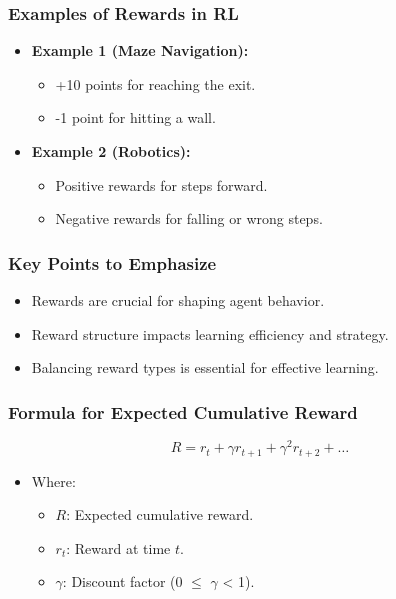 \documentclass{beamer}
\begin{document}
\begin{frame}[fragile]
    \frametitle{Examples of Rewards in RL}
    \begin{itemize}
        \item \textbf{Example 1 (Maze Navigation):}
        \begin{itemize}
            \item +10 points for reaching the exit.
            \item -1 point for hitting a wall.
        \end{itemize}
        \item \textbf{Example 2 (Robotics):}
        \begin{itemize}
            \item Positive rewards for steps forward.
            \item Negative rewards for falling or wrong steps.
        \end{itemize}
    \end{itemize}
\end{frame}

\begin{frame}[fragile]
    \frametitle{Key Points to Emphasize}
    \begin{itemize}
        \item Rewards are crucial for shaping agent behavior.
        \item Reward structure impacts learning efficiency and strategy.
        \item Balancing reward types is essential for effective learning.
    \end{itemize}
\end{frame}

\begin{frame}[fragile]
    \frametitle{Formula for Expected Cumulative Reward}
    \begin{equation}
        R = r_t + \gamma r_{t+1} + \gamma^2 r_{t+2} + \ldots
    \end{equation}
    \begin{itemize}
        \item Where:
        \begin{itemize}
            \item \( R \): Expected cumulative reward.
            \item \( r_t \): Reward at time \( t \).
            \item \( \gamma \): Discount factor (0 $\leq$ $\gamma$ < 1).
        \end{itemize}
    \end{itemize}
\end{frame}
\end{document}
